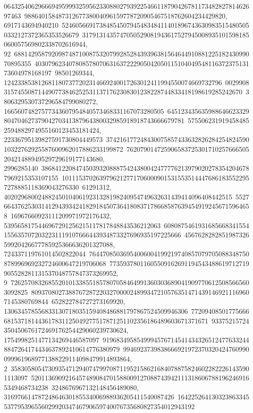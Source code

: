 {{{06432540629666949599932595623308802793922546611879042678117348282781462697463\
98864015848731267738004096159778720905467518762604234429820, 6917143694940210\
52460566917384854507945483484114018967436309835154805050332127372365353526679\
3179131435747050529081943617527945008935101598185060057569802338702616944, 92\
68814295879209874871008753207992852843939638156464491088122518243099070895355\
40307962340780857807063163722290504205011510404954811637237513173604978168197\
98501269344, 1242338538126811807377202314669240017263012411994550074669732796\
00299083157455087144907738462525311371762308301238228744833418198619285242670\
3806329530737296584799080272, 16656074827577343607954840573468331167073280505\
64512343563598864662332980470462737904270341387964380032985918918743666679781\
5755062319194584852594882974955160123453181424, 22336795139827591730804449573\
37421617724843007585743363282628425482459010322762925587600962017886233199872\
76207901472590658372530171025766650520421488949529729619177143680, 2996285140\
38684122084745039320888754243800424777762139790202783542046787969215353107155\
10111537026397962127717060009015315535144476861835522957278885118369043276330\
61291312, 4020296800248824501040619231328198240954749632631439414096408442515\
55276643762530314129439342418291845073641808371786685876394549192456715964658\
16967660923111209971972176432, 5395658175446967291256215117817848843536212063\
60808754619316856683415541556357072032231119107666443934873327696935197225666\
456762828285198732659920426677785925366636201327088, 724337119761014502822044\
76447085036954006004199219740857079705088348750878996969232724600647219706068\
77359378011605509162691194543488619712719905528281131537048757847373269952, 9\
72625708326855201013385518578070584649913603036890419097706125085665603092825\
80937080273887672872203270000248993472105763514714391469211169607145380769844\
652822784727273169920, 130634578556833130718035159408486881797867524509946306\
77209408501775666681537181443617831125049277517871251102356186489603671371671\
93375215724350450676172469176254429060239730624, 1754998251477134269446587097\
91968349585499945767145414343265124776332448847264174434637892410614776380979\
99469237398386669219723703204247609900999619689771388229114098479914893864, 2\
35830580547309354712940747997087119521586216840788758246022822261435901113097\
52011369092164574890847015880091270887439421113186067881962469165349468734238\
3248676967132148456489080, 31697661478724864630185534006988936205411540087426\
16422526413032386334553779539655602992034746790659740076735680827354012943192\
}}}

